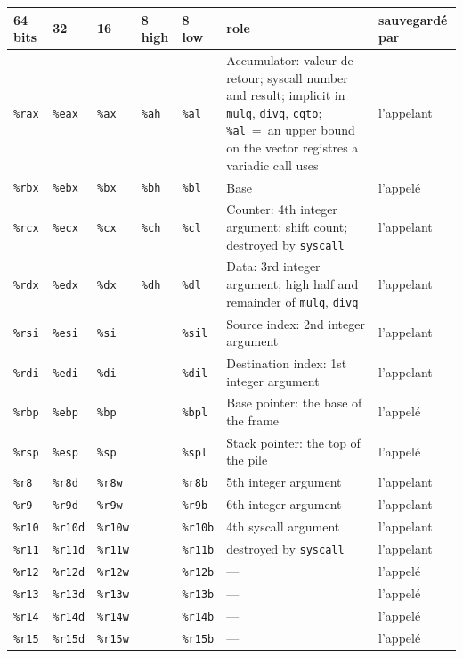 \clearpage
{}
\begin{tabularx}{\linewidth}{@{}lllllXl@{}}
\toprule
64 bits & 32 & 16 & 8 high & 8 low & role & sauvegardé par \\
\midrule
\texttt{\%rax} & \texttt{\%eax} & \texttt{\%ax} & \texttt{\%ah} & \texttt{\%al} & Accumulator: valeur de retour; syscall number and result; implicit in \texttt{mulq}, \texttt{divq}, \texttt{cqto}; \texttt{\%al}~=~an upper bound on the vector registres a variadic call uses & l'appelant \\
\texttt{\%rbx} & \texttt{\%ebx} & \texttt{\%bx} & \texttt{\%bh} & \texttt{\%bl} & Base & l'appelé \\
\texttt{\%rcx} & \texttt{\%ecx} & \texttt{\%cx} & \texttt{\%ch} & \texttt{\%cl} & Counter: 4th integer argument; shift count; destroyed by \texttt{syscall} & l'appelant \\
\texttt{\%rdx} & \texttt{\%edx} & \texttt{\%dx} & \texttt{\%dh} & \texttt{\%dl} & Data: 3rd integer argument; high half and remainder of \texttt{mulq}, \texttt{divq} & l'appelant \\
\texttt{\%rsi} & \texttt{\%esi} & \texttt{\%si} & & \texttt{\%sil} & Source index: 2nd integer argument & l'appelant \\
\texttt{\%rdi} & \texttt{\%edi} & \texttt{\%di} & & \texttt{\%dil} & Destination index: 1st integer argument & l'appelant \\
\texttt{\%rbp} & \texttt{\%ebp} & \texttt{\%bp} & & \texttt{\%bpl} & Base pointer: the base of the frame & l'appelé \\
\texttt{\%rsp} & \texttt{\%esp} & \texttt{\%sp} & & \texttt{\%spl} & Stack pointer: the top of the pile & l'appelé \\
\texttt{\%r8}  & \texttt{\%r8d}  & \texttt{\%r8w}  & & \texttt{\%r8b}  & 5th integer argument & l'appelant \\
\texttt{\%r9}  & \texttt{\%r9d}  & \texttt{\%r9w}  & & \texttt{\%r9b}  & 6th integer argument & l'appelant \\
\texttt{\%r10} & \texttt{\%r10d} & \texttt{\%r10w} & & \texttt{\%r10b} & 4th syscall argument & l'appelant \\
\texttt{\%r11} & \texttt{\%r11d} & \texttt{\%r11w} & & \texttt{\%r11b} & destroyed by \texttt{syscall} & l'appelant \\
\texttt{\%r12} & \texttt{\%r12d} & \texttt{\%r12w} & & \texttt{\%r12b} & --- & l'appelé \\
\texttt{\%r13} & \texttt{\%r13d} & \texttt{\%r13w} & & \texttt{\%r13b} & --- & l'appelé \\
\texttt{\%r14} & \texttt{\%r14d} & \texttt{\%r14w} & & \texttt{\%r14b} & --- & l'appelé \\
\texttt{\%r15} & \texttt{\%r15d} & \texttt{\%r15w} & & \texttt{\%r15b} & --- & l'appelé \\
\bottomrule
\end{tabularx}
